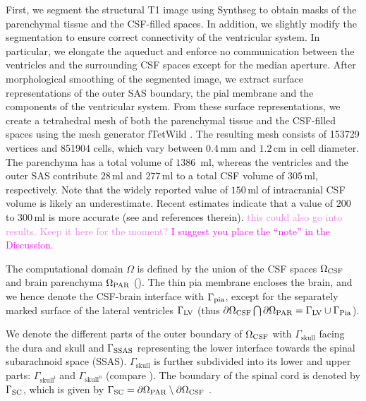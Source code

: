 \documentclass[fleqn,10pt]{wlscirep}
\newcommand{\mer}[1]{\textcolor{magenta}{#1}}
\newcommand{\mar}[1]{\textcolor{violet}{#1}}
\begin{document}
First, we segment the structural T1 image using Synthseg \cite{billot2023robust,billot2023synthseg} to obtain masks of the parenchymal tissue and the CSF-filled spaces. In addition, we slightly modify the segmentation to ensure correct connectivity of the ventricular system. In particular, we elongate the aqueduct and enforce no communication between the ventricles and the surrounding CSF spaces except for the median aperture. After morphological smoothing of the segmented image, we extract surface representations of the outer SAS boundary, the pial membrane and the components of the ventricular system. From these surface representations, we create a tetrahedral mesh of both the parenchymal tissue and the CSF-filled spaces using the mesh generator fTetWild \cite{hu2020fast}. The resulting mesh consists of 153729 vertices and 851904 cells, which vary between $0.4$\,mm and $1.2$\,cm in cell diameter. The parenchyma has a total volume of $1386$\, ml, whereas the ventricles and the outer SAS contribute $28$\,ml and $277$\,ml to a total CSF volume of $305$\,ml, respectively. Note that the widely reported value of $150$\,ml of intracranial CSF volume is likely an underestimate. Recent estimates indicate that a value of $200$ to $300$\,ml is more accurate (see \cite{hladky2024regulation} and references therein).
\mar{this could also go into results. Keep it here for the moment?} \mer{I suggest you place the ``note'' in the Discussion.}


The computational domain $\Omega$ is defined by the union of the CSF spaces $\Omega_{\rm CSF}$ and brain parenchyma $\Omega_{\rm PAR}$ (). The thin pia membrane encloses the brain, and we hence denote the CSF-brain interface with $\Gamma_{\rm pia}$, except for the separately marked surface of the lateral ventricles $\Gamma_{\rm LV}$ (thus $\partial \Omega_{\rm CSF} \bigcap \partial \Omega_{\rm PAR} = \Gamma_{\rm LV} \cup \Gamma_{\rm Pia}$).

We denote the different parts of the outer boundary of $\Omega_{\rm CSF}$ with
$\Gamma_{\mathrm{skull}}$ facing the dura and skull and $\Gamma_{\rm SSAS}$ representing the lower interface towards the spinal subarachnoid space (SSAS). $\Gamma_{\mathrm{skull}}$ is further subdivided into its lower and upper parts: $\Gamma_{\mathrm{skull^l}}$ and $\Gamma_{\mathrm{skull^u}}$ (compare ). The boundary of the spinal cord is denoted by $\Gamma_{\rm{SC}}$, which is given by $\Gamma_{\rm{SC}} = \partial \Omega_{\rm PAR} \setminus \partial \Omega_{\rm CSF}$ .
\end{document}
